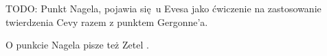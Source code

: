 %

TODO: Punkt Nagela, pojawia się u Evesa \cite[s. 71]{eves1_1972} jako ćwiczenie na zastosowanie twierdzenia Cevy razem z punktem Gergonne'a.

\begin{proposition}
    \label{punkt_nagela}
\end{proposition}

O punkcie Nagela pisze też Zetel \cite[s. 22, 25]{zetel_2020}.

%